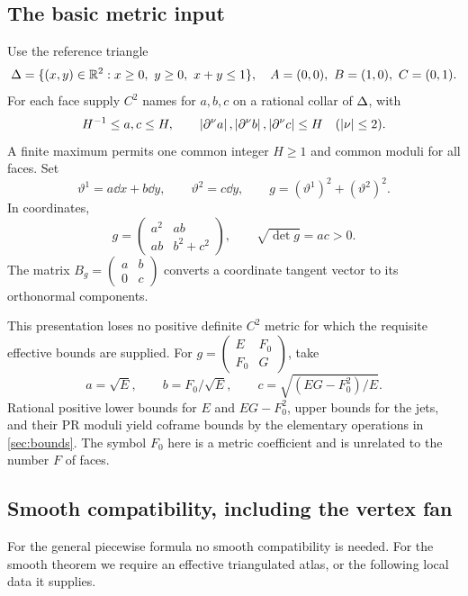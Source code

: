 \subsection{The basic metric input}

Use the reference triangle
\[
\Delta=\{(x,y)\in\mathbb R^2:x\ge0,\ y\ge0,\ x+y\le1\},
\quad A=(0,0),\ B=(1,0),\ C=(0,1).
\]
For each face supply $C^2$ names for $a,b,c$ on a rational collar of $\Delta$, with
\begin{equation}\label{eq:Hbounds}
H^{-1}\le a,c\le H,\qquad
\left|\partial^\nu a\right|,\left|\partial^\nu b\right|,\left|\partial^\nu c\right|\le H
\quad(|\nu|\le2).
\end{equation}
A finite maximum permits one common integer $H\ge1$ and common moduli for all faces. Set
\begin{equation}\label{eq:coframe}
\vartheta^1=a\dd x+b\dd y,
\qquad \vartheta^2=c\dd y,
\qquad g=(\vartheta^1)^2+(\vartheta^2)^2.
\end{equation}
In coordinates,
\[
g=\begin{pmatrix}a^2&ab\\ab&b^2+c^2\end{pmatrix},
\qquad \sqrt{\det g}=ac>0.
\]
The matrix $B_g=\left(\begin{smallmatrix}a&b\\0&c\end{smallmatrix}\right)$ converts a coordinate tangent vector to its orthonormal components.

This presentation loses no positive definite $C^2$ metric for which the requisite effective bounds are supplied. For
$g=\left(\begin{smallmatrix}E&F_0\\F_0&G\end{smallmatrix}\right)$, take
\[
a=\sqrt E,\qquad b=F_0/\sqrt E,\qquad
c=\sqrt{(EG-F_0^2)/E}.
\]
Rational positive lower bounds for $E$ and $EG-F_0^2$, upper bounds for the jets, and their PR moduli yield coframe bounds by the elementary operations in \cref{sec:bounds}. The symbol $F_0$ here is a metric coefficient and is unrelated to the number $F$ of faces.

\subsection{Smooth compatibility, including the vertex fan}\label{sec:compatibilitydata}

For the general piecewise formula no smooth compatibility is needed. For the smooth theorem we require an effective triangulated atlas, or the following local data it supplies.

